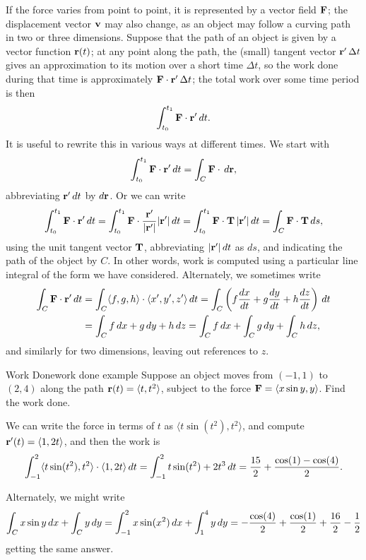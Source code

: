 If the force varies from point to point, it is represented by a vector
field $\bf F$; the displacement vector $\bf v$ may also change, as an object
may follow a curving path in two or three dimensions. Suppose that the
path of an object is given by a vector function ${\bf r}(t)$; at any
point along the path, the (small) tangent vector ${\bf r}'\,\Delta t$ 
gives an approximation to its motion over a short time $\Delta t$, so
the work done during that time is approximately 
${\bf F}\cdot{\bf r}'\,\Delta t$; the total work over some time period
is then
$$\int_{t_0}^{t_1} {\bf F}\cdot{\bf r}'\,dt.$$
It is useful to rewrite this in various ways at different times. 
We  start with 
$$\int_{t_0}^{t_1} {\bf F}\cdot{\bf r}'\,dt=\int_C {\bf F}\cdot\,d{\bf
  r},$$
abbreviating ${\bf r}'\,dt$ by $d{\bf r}$. Or we can write
$$\int_{t_0}^{t_1} {\bf F}\cdot{\bf r}'\,dt=
\int_{t_0}^{t_1} {\bf F}\cdot{{\bf r}'\over|{\bf r}'|}|{\bf r}'|\,dt=
\int_{t_0}^{t_1} {\bf F}\cdot{\bf T}\,|{\bf r}'|\,dt=
\int_{C} {\bf F}\cdot{\bf T}\,ds,$$
using the unit tangent vector $\bf T$, abbreviating 
$|{\bf r}'|\,dt$ as $ds$, and indicating the path of the object by
$C$. In other words, work is computed using a particular line integral
of the form we have considered.
Alternately, we sometimes write
\begin{align*}
\int_C {\bf F}\cdot{\bf r}'\,dt&=
\int_C \langle f,g,h\rangle\cdot\langle x',y',z'\rangle\,dt=
\int_C \left(f{dx\over dt}+g{dy\over dt}+h{dz\over dt}\right)\,dt	\\
&=
\int_C f\,dx+g\,dy+h\,dz=
\int_C f\,dx+\int_C g\,dy+\int_C h\,dz,
\end{align*}
and similarly for two dimensions, leaving out references to $z$.

\begin{example}{Work Done}{work done example}
Suppose an object moves from $(-1,1)$ to
$(2,4)$ along the path ${\bf r}(t)=\langle t,t^2\rangle$,
subject to the force ${\bf F}=\langle x\sin y,y\rangle$. Find the work
done. 
\end{example}
\begin{solution}
We can write the force in terms of $t$ as $\langle t\sin(t^2),t^2\rangle$,
and compute ${\bf r}'(t)=\langle 1,2t\rangle$, and then the work is
$$\int_{-1}^2 \langle t\sin(t^2),t^2\rangle\cdot\langle
1,2t\rangle\,dt
= \int_{-1}^2 t\sin(t^2) + 2t^3\,dt={15\over2}+{\cos(1)-\cos(4)\over2}.
$$

Alternately, we might write
$$\int_C x\sin y\,dx+\int_C y\,dy=
\int_{-1}^2 x\sin(x^2)\,dx + \int_1^4 y\,dy=
-{\cos(4)\over 2}+{\cos(1)\over 2}+{16\over2}-{1\over2}$$
getting the same answer.
\end{solution}


